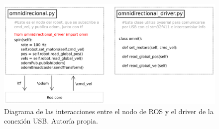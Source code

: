 \begin{figure}[H]
\centering
\includegraphics[scale=0.4]{imagenes/diagrama_rosnode.png}
\caption{Diagrama de las interacciones entre el nodo de ROS y el driver de la conexión USB. Autoría propia.}
\label{F:rosnode}
\end{figure}

